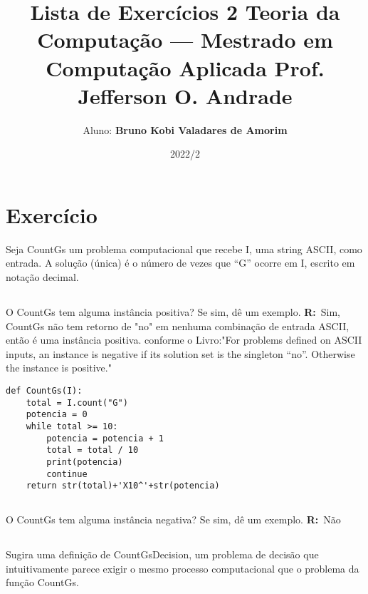 \documentclass[12pt]{scrartcl}
\begin{document}
\author{Aluno: \textbf{Bruno Kobi Valadares de Amorim}}


\title{Lista de Exercícios 2 \newline\newline
\large Teoria da Computação — Mestrado em Computação Aplicada\newline
\large Prof. Jefferson O. Andrade\newline
}
\date{2022/2}
\maketitle

\section{Exercício}
Seja CountGs um problema computacional que recebe I, uma string ASCII, como entrada.
A solução (única) é o número de vezes que “G” ocorre em I, escrito em notação decimal.

\subsection{}
O CountGs tem alguma instância positiva? Se sim, dê um exemplo.
\newline\newline\textbf{R:}\ Sim, CountGs não tem retorno de "no" em nenhuma combinação de entrada ASCII, então é uma instância positiva. conforme o Livro:"For problems defined on ASCII inputs, an instance is negative if its solution set is the singleton {“no”}. Otherwise the instance is positive."  


\begin{verbatim}
def CountGs(I):
    total = I.count("G")  
    potencia = 0
    while total >= 10:
        potencia = potencia + 1
        total = total / 10
        print(potencia)
        continue
    return str(total)+'X10^'+str(potencia)
\end{verbatim}

\subsection{}
O CountGs tem alguma instância negativa? Se sim, dê um exemplo.
\newline\newline\textbf{R:}\ Não


\subsection{}
Sugira uma definição de CountGsDecision, um problema de decisão que intuitivamente parece exigir o mesmo processo computacional que o problema da função
CountGs.
\end{document}
